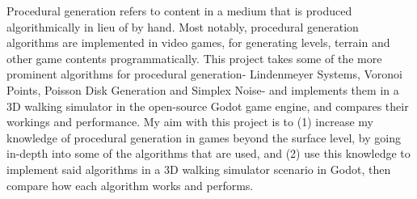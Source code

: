 Procedural generation refers to content in a medium that is produced algorithmically in lieu of by hand. Most notably, procedural generation algorithms are implemented in video games, for generating levels, terrain and other game contents programmatically. This project takes some of the more prominent algorithms for procedural generation- Lindenmeyer Systems, Voronoi Points, Poisson Disk Generation and Simplex Noise- and implements them in a 3D walking simulator in the open-source Godot game engine, and compares their workings and performance. My aim with this project is to (1) increase my knowledge of procedural generation in games beyond the surface level, by going in-depth into some of the algorithms that are used, and (2) use this knowledge to implement said algorithms in a 3D walking simulator scenario in Godot, then compare how each algorithm works and performs.